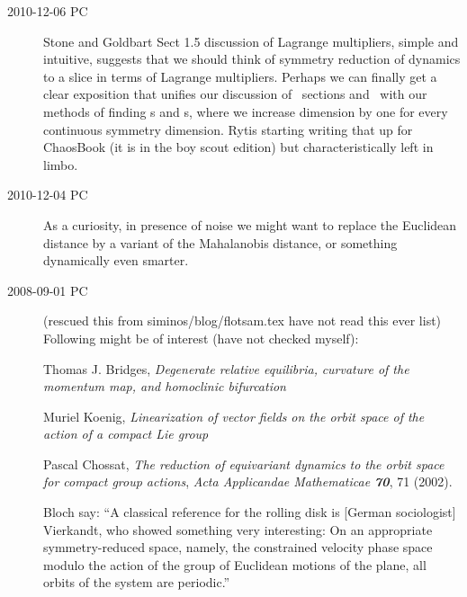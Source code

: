 \begin{description}
\item[2010-12-06 PC]
{Stone and Goldbart} Sect 1.5 discussion of Lagrange
multipliers, simple and intuitive, suggests that we should think of
symmetry reduction of dynamics to a slice in terms of Lagrange
multipliers. Perhaps we can finally get a clear exposition that unifies
our discussion of \Poincare\ sections and \reducedsp\ with our methods of
finding \po s and \rpo s, where we increase dimension by one for every
continuous symmetry dimension. Rytis starting writing that up for
ChaosBook (it is in the boy scout edition) but characteristically left in
limbo.

\item[2010-12-04 PC]
As a curiosity, in presence of noise we might want to replace the Euclidean
distance by a variant of the
{Mahalanobis distance}, or something dynamically even
smarter.

\item[2008-09-01 PC] (rescued this from siminos/blog/flotsam.tex
have not read this ever list)
Following might be of interest (have not checked myself):


\noindent
Thomas J. Bridges,
{\emph{Degenerate relative equilibria,}}
\emph{curvature of the momentum map, and homoclinic bifurcation}

Muriel Koenig,
{\emph{Linearization of vector fields}}
\emph{ on the orbit space of the action of a compact Lie group}

Pascal Chossat,
{\emph{The reduction of equivariant dynamics}}
\emph{to the orbit space for compact group actions},
{\em Acta Applicandae Mathematicae \bf 70}, 71 (2002). %

     {Bloch \etal} say:
``A classical reference for the rolling disk is [German
sociologist]
{Vierkandt}, who showed
something very interesting: On an appropriate
symmetry-reduced space, namely, the constrained velocity
phase space modulo the action of the group of Euclidean
motions of the plane, all orbits of the system are
periodic.''


\end{description}
